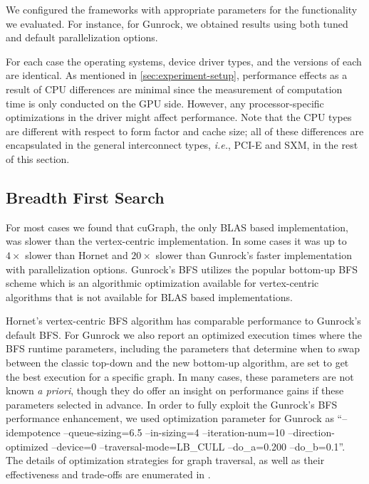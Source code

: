 We configured the frameworks with appropriate parameters for the functionality we evaluated. For instance, for Gunrock, we obtained results using both tuned and default parallelization options. 

For each case the operating systems, device driver types, and the versions of each are identical. As mentioned in \ref{sec:experiment-setup}, performance effects as a result of CPU differences are minimal since the measurement of computation time is only conducted on the GPU side. However, any processor-specific optimizations in the driver might affect performance. Note that the CPU types are different with respect to form factor and cache size; all of these differences are encapsulated in the general interconnect types, \emph{i.e.}, PCI-E and SXM, in the rest of this section.

 \subsection{Breadth First Search}
For most cases we found that cuGraph, the only BLAS based implementation, was slower than the vertex-centric implementation. In some cases it was up to $4 \times$ slower than Hornet and $20\times$ slower than Gunrock's faster implementation with parallelization options. Gunrock's BFS utilizes the popular bottom-up BFS scheme which is an algorithmic optimization available for vertex-centric algorithms that is not available for BLAS based implementations.
 
Hornet's vertex-centric BFS algorithm has comparable performance to Gunrock's default BFS. For Gunrock we also report an optimized execution times where the BFS runtime parameters, including the parameters that determine when to swap between the classic top-down and the new bottom-up algorithm, are set to get the best execution for a specific graph. In many cases, these parameters are not known \emph{a priori}, though they do offer an insight on performance gains 
if these parameters %
selected in advance. In order to fully exploit the Gunrock's BFS performance enhancement, we used optimization parameter for Gunrock as ``--idempotence --queue-sizing=6.5 --in-sizing=4 --iteration-num=10 --direction-optimized --device=0 --traversal-mode=LB\_CULL --do\_a=0.200 --do\_b=0.1''. The details of optimization strategies for graph traversal, as well as their effectiveness and trade-offs are enumerated in \cite{wang2017gunrock}.

